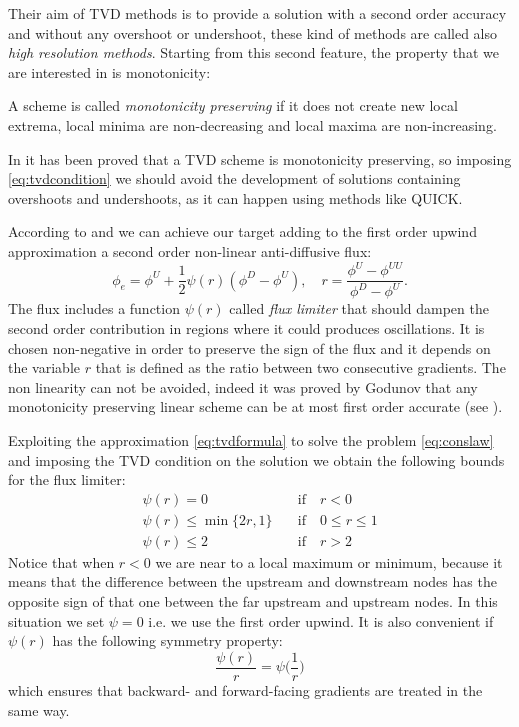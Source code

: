 Their aim of TVD methods is to provide a solution with a second order accuracy 
and without any overshoot or undershoot, these kind of methods are called also 
\emph{high resolution methods}. Starting from this second feature, the 
property 
that we are interested in is monotonicity:
\begin{defn}
	A scheme is called \emph{monotonicity preserving} if it does not create new 
	local extrema, local minima are non-decreasing and local maxima are 
	non-increasing.
\end{defn}
In \cite{tvd:monotonicity} it has been proved that a TVD scheme is 
monotonicity 
preserving, so imposing \eqref{eq:tvdcondition} we should avoid the 
development 
of solutions containing overshoots and undershoots, as it can happen using 
methods like QUICK.

According to \cite{tvd:sweeby} and \cite{main:darwish} we can achieve our 
target adding to the first order upwind approximation a second order 
non-linear 
anti-diffusive flux: 
\begin{equation} \label{eq:tvdformula}
\phi_e = \phi^U + \frac{1}{2}\psi(r)(\phi^D - \phi^U), \quad r = 
\frac{\phi^U - \phi^{UU}}{\phi^D - \phi^U}.
\end{equation}
The flux includes a function $\psi(r)$ called \emph{flux limiter} that should 
dampen the second order contribution in regions where it could produces 
oscillations. It is chosen non-negative in order to preserve the sign of the 
flux and it depends on the variable $r$ that is defined as the ratio between 
two consecutive gradients. The non linearity can not be avoided, indeed it was 
proved by Godunov that any monotonicity preserving linear scheme can be at 
most 
first order accurate (see \cite{tvd:godunov}).

Exploiting the approximation \eqref{eq:tvdformula} to solve the problem 
\eqref{eq:conslaw} and imposing the TVD condition on the solution we obtain 
the 
following bounds for the flux limiter:
\begin{align}
\psi(r) = 0 \quad &\text{if} \quad r < 0\\
\psi(r) \leq \min \{2r, 1\} \quad &\text{if} \quad 0 \leq r \leq 1\\
\psi(r) \leq 2 \quad &\text{if} \quad r > 2
\end{align}
Notice that when $r<0$ we are near to a local maximum or minimum, because it 
means that the difference between the upstream and downstream nodes has the 
opposite sign of that one between the far upstream and upstream nodes. In this 
situation we set $\psi = 0$ i.e. we use the first order upwind.
It is also convenient if $\psi(r)$ has the following symmetry property:
\begin{equation}
\frac{\psi(r)}{r} = \psi\bigg(\frac{1}{r}\bigg)
\end{equation}
which ensures that backward- and forward-facing gradients are treated in the 
same way.

